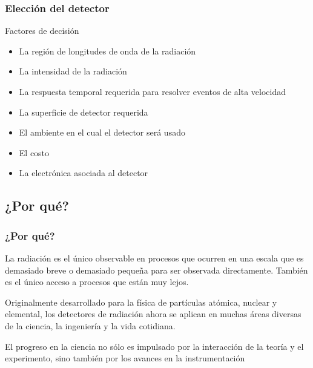 \documentclass{beamer}
\begin{document}
\begin{frame}
\frametitle{Elecci\'on del detector}
\begin{alertblock}{Factores de decisi\'on}
\begin{itemize}
\item La regi\'on de longitudes de onda de la radiaci\'on 
\item La intensidad de la radiaci\'on
\item La respuesta temporal requerida para resolver eventos de alta
velocidad
\item La superficie de detector requerida
\item El ambiente en el cual el detector ser\'a usado
\item El costo
\item La electr\'onica asociada al detector
\end{itemize}
\end{alertblock}
\end{frame} 

\subsection{¿Por qu\'e?}

\begin{frame}
\frametitle{¿Por qu\'e?}
{
\begin{block}{}
La radiaci\'on es el \'unico {\color{red}observable} en procesos que ocurren en una escala que es
demasiado breve o demasiado pequeña para ser observada directamente. Tambi\'en es
el \'unico acceso a procesos que est\'an muy lejos.
\end{block}
}
\begin{block}{}
Originalmente desarrollado para la f\'isica de part\'iculas at\'omica, nuclear y
elemental, los detectores de radiaci\'on ahora se aplican en muchas \'areas diversas
de la ciencia, la ingenier\'ia y la vida cotidiana.
\end{block}
{
\begin{block}{}
El progreso en la ciencia no s\'olo es impulsado por la interacci\'on de la teor\'ia y
el experimento, sino tambi\'en por los avances en la {\color{blue}instrumentaci\'on}
\end{block}
}
\end{frame}
\end{document}
